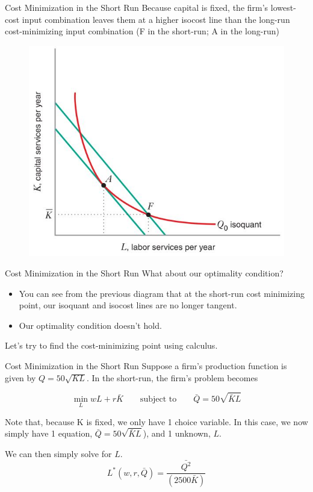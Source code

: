 \documentclass[11pt,t]{beamer}
\begin{document}
\begin{frame}{Cost Minimization in the Short Run}
  Because capital is fixed, the firm's lowest-cost input combination leaves them at a higher isocost line than the long-run cost-minimizing input combination (F in the short-run; A in the long-run)

  \begin{figure}
    \includegraphics[width=0.6\linewidth]{figures/fig7_13.jpg}
  \end{figure}
\end{frame}

\begin{frame}{Cost Minimization in the Short Run}
  What about our optimality condition?

  \begin{itemize}
    \item You can see from the previous diagram that at the  short-run cost minimizing point, our isoquant and isocost lines are no longer tangent.
    
    \item Our optimality condition doesn't hold.
  \end{itemize}

  \pause\bigskip
  Let's try to find the cost-minimizing point using calculus.
\end{frame}

\begin{frame}{Cost Minimization in the Short Run}
  Suppose a firm's production function is given by $Q =50\sqrt{KL}$. In the short-run, the firm's problem becomes

  $$
    \min_{L} wL+ r\bar{K} \qquad \text{subject to} \qquad \bar{Q} = 50\sqrt{\bar{K}L}
  $$

  \pause\bigskip
  Note that, because K is fixed, we only have 1 choice variable. In this case, we now simply have 1 equation, $\bar{Q} = 50\sqrt{\bar{K}L}$), and 1 unknown, $L$.
  
  \bigskip
  We can then simply solve for $L$.
  \begin{equation*}
    L^*(w,r,\bar{Q}) = \frac{\bar{Q^2}}{(2500\bar{K})}
  \end{equation*}
\end{frame}
\end{document}
